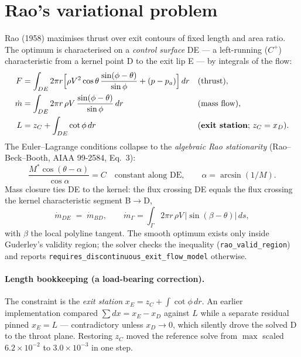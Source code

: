 \documentclass[11pt]{article}
\begin{document}
\section{Rao's variational problem}
\label{sec:rao}
Rao (1958) maximises thrust over exit contours of fixed length and area
ratio.  The optimum is characterised on a \emph{control surface} DE --- a
left-running ($C^{+}$) characteristic from a kernel point D to the exit
lip E --- by integrals of the flow:
\begin{align}
F &= \int_{DE} 2\pi r\Big[\rho V^2 \cos\theta\,
      \frac{\sin(\phi-\theta)}{\sin\phi} + (p-p_a)\Big]\,dr
      &&\text{(thrust)},\\
\dot m &= \int_{DE} 2\pi r\,\rho V\,\frac{\sin(\phi-\theta)}{\sin\phi}\,dr
      &&\text{(mass flow)},\\
L &= z_C + \int_{DE} \cot\phi\, dr
      &&\text{(\textbf{exit station}; } z_C = x_D\text{)} .
\end{align}
The Euler--Lagrange conditions collapse to the \emph{algebraic Rao
stationarity} (Rao--Beck--Booth, AIAA 99-2584, Eq.~3):
\begin{equation}
\boxed{\ \frac{M^{*}\cos(\theta-\alpha)}{\cos\alpha} = C
\quad\text{constant along DE},\qquad \alpha=\arcsin(1/M).\ }
\label{eq:stationarity}
\end{equation}
Mass closure ties DE to the kernel: the flux crossing DE equals the
flux crossing the kernel characteristic segment B$\to$D,
\begin{equation}
\dot m_{DE} \;=\; \dot m_{BD},\qquad
\dot m_{\Gamma} = \int_{\Gamma} 2\pi r\,\rho V\,
|\sin(\beta-\theta)|\,ds ,
\label{eq:mass}
\end{equation}
with $\beta$ the local polyline tangent.  The smooth optimum exists
only inside Guderley's validity region; the solver checks the
inequality (\texttt{rao\_valid\_region}) and reports
\texttt{requires\_discontinuous\_exit\_flow\_model} otherwise.

\paragraph{Length bookkeeping (a load-bearing correction).}
The constraint is the \emph{exit station} $x_E = z_C + \int\cot\phi\,dr$.
An earlier implementation compared $\sum dx = x_E - x_D$ against $L$
while a separate residual pinned $x_E=L$ --- contradictory unless
$x_D\to0$, which silently drove the solved D to the throat plane.
Restoring $z_C$ moved the reference solve from
$\max$ scaled $6.2\times10^{-2}$ to $3.0\times10^{-3}$ in one step.
\end{document}
